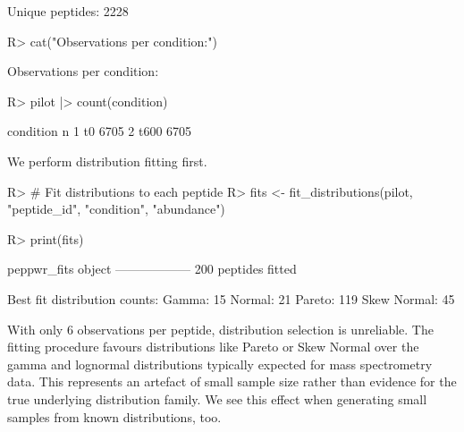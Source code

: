 \documentclass[article]{jss}
\begin{document}
\begin{Schunk}
\begin{Soutput}
Unique peptides: 2228 
\end{Soutput}
\begin{Sinput}
R> cat("Observations per condition:\n")
\end{Sinput}
\begin{Soutput}
Observations per condition:
\end{Soutput}
\begin{Sinput}
R> pilot |> count(condition)
\end{Sinput}
\begin{Soutput}
  condition    n
1        t0 6705
2      t600 6705
\end{Soutput}
\end{Schunk}

We perform distribution fitting first.

\begin{Schunk}
\begin{Sinput}
R> # Fit distributions to each peptide
R> fits <- fit_distributions(pilot, "peptide_id", "condition", "abundance")
\end{Sinput}
\end{Schunk}


\begin{Schunk}
\begin{Sinput}
R> print(fits)
\end{Sinput}
\begin{Soutput}
peppwr_fits object
------------------
200 peptides fitted

Best fit distribution counts:
  Gamma: 15
  Normal: 21
  Pareto: 119
  Skew Normal: 45
\end{Soutput}
\end{Schunk}

With only 6 observations per peptide, distribution selection is unreliable. The fitting procedure favours distributions like Pareto or Skew Normal over the gamma and lognormal distributions typically expected for mass spectrometry data. This represents an artefact of small sample size rather than evidence for the true underlying distribution family. We see this effect when generating small samples from known distributions, too.
\end{document}
